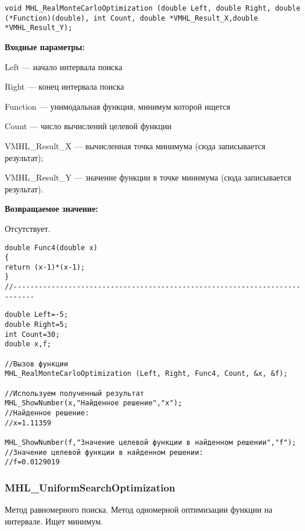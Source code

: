 \documentclass[a4paper,12pt]{article}
\begin{document}
\begin{lstlisting}[label=code_syntax_MHL_RealMonteCarloOptimization,caption=Синтаксис]
void MHL_RealMonteCarloOptimization (double Left, double Right, double (*Function)(double), int Count, double *VMHL_Result_X,double *VMHL_Result_Y);
\end{lstlisting}

\textbf{Входные параметры:}

 Left --- начало интервала поиска
 
Right --- конец интервала поиска
 
Function --- унимодальная функция, минимум которой ищется
 
Count --- число вычислений целевой функции
 
VMHL\_Result\_X --- вычисленная точка минимума (сюда записывается результат);
 
VMHL\_Result\_Y --- значение функции в точке минимума (сюда записывается результат).

\textbf{Возвращаемое значение:}
 
 Отсутствует.

\begin{lstlisting}[caption=Оптимизируемая функция]
double Func4(double x)
{
return (x-1)*(x-1);
}
//---------------------------------------------------------------------------
\end{lstlisting}


\begin{lstlisting}[label=code_use_MHL_RealMonteCarloOptimization,caption=Пример использования]
double Left=-5;
double Right=5;
int Count=30;
double x,f;

//Вызов функции
MHL_RealMonteCarloOptimization (Left, Right, Func4, Count, &x, &f);

//Используем полученный результат
MHL_ShowNumber(x,"Найденное решение","x");
//Найденное решение:
//x=1.11359

MHL_ShowNumber(f,"Значение целевой функции в найденном решении","f");
//Значение целевой функции в найденном решении:
//f=0.0129019
\end{lstlisting}

\subsubsection{MHL\_UniformSearchOptimization}\label{MHL_UniformSearchOptimization}

Метод равномерного поиска. Метод одномерной оптимизации функции на интервале. Ищет минимум.
\end{document}

